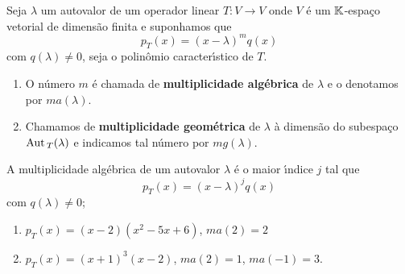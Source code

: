 \begin{definicao}
	Seja $\lambda$ um autovalor de um operador linear $T : V \to V$ onde $V$ \'e um $\mathbb{K}$-espa\c{c}o vetorial de dimens\~ao finita e suponhamos que
	\[
		p_T(x) = (x - \lambda)^mq(x)
	\]
	com $q(\lambda) \ne 0$, seja o polin\^omio caracter{\'\i}stico de $T$.
	\begin{enumerate}[label={\roman*})]
		\item O n\'umero $m$ \'e chamada de \textbf{multiplicidade alg\'ebrica} de $\lambda$ e o denotamos por $ma(\lambda)$.
		\item Chamamos de \textbf{multiplicidade geom\'etrica} de $\lambda$ \`a dimens\~ao do subespa\c{c}o ${\rm Aut\,}_T(\lambda)$ e indicamos tal n\'umero por $mg(\lambda)$.
	\end{enumerate}
\end{definicao}

\begin{observacao}
	A multiplicidade alg\'ebrica de um autovalor $\lambda$ \'e o maior {\'\i}ndice $j$ tal que
	\[
		p_T(x) = (x - \lambda)^jq(x)
	\]
	com $q(\lambda) \ne 0$;
\end{observacao}

\begin{exemplo}
	\begin{enumerate}[label={\arabic*})]
		\item $p_T(x) = (x - 2)(x^2 - 5x + 6)$, $ma(2) = 2$
		\item $p_T(x) = (x + 1)^3(x - 2)$, $ma(2) = 1$, $ma(-1) = 3$.
	\end{enumerate}
\end{exemplo}

